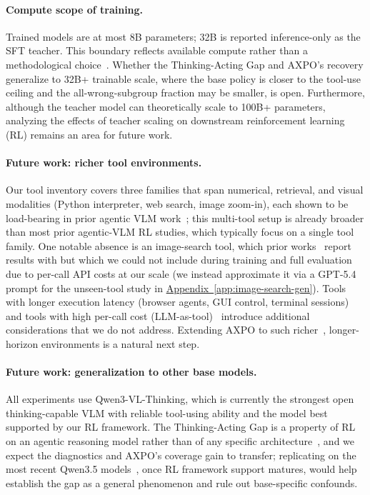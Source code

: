 \documentclass{llmxive}
\providecommand{\appref}[1]{\hyperref[#1]{Appendix~\ref*{#1}}}
\begin{document}
\paragraph{Compute scope of training.}
Trained models are at most 8B parameters; 32B is reported inference-only as the SFT teacher. This boundary reflects available compute rather than a methodological choice~\citep{kim2026visualtokenpruningfails, lee2025maskingteacherreinforcingstudent, yu2026hideseereasoningprefixmasking, lee2026genrecalgenerationrecalibrationlarge, Lee_2025_CVPR}.
Whether the Thinking-Acting Gap and AXPO's recovery generalize to 32B+ trainable scale, where the base policy is closer to the tool-use ceiling and the all-wrong-subgroup fraction may be smaller, is open.
Furthermore, although the teacher model can theoretically scale to 100B+ parameters, analyzing the effects of teacher scaling on downstream reinforcement learning (RL) remains an area for future work.

\paragraph{Future work: richer tool environments.}
Our tool inventory covers three families that span numerical, retrieval, and visual modalities (Python interpreter, web search, image zoom-in), each shown to be load-bearing in prior agentic VLM work~\citep{deepeyesv2, pyvision-rl, mini-o3}; this multi-tool setup is already broader than most prior agentic-VLM RL studies, which typically focus on a single tool family. One notable absence is an image-search tool, which prior works~\citep{deepeyesv2,hrmmsearch} report results with but which we could not include during training and full evaluation due to per-call API costs at our scale (we instead approximate it via a GPT-5.4 prompt for the unseen-tool study in \appref{app:image-search-gen}). Tools with longer execution latency (browser agents, GUI control, terminal sessions) and tools with high per-call cost (LLM-as-tool)~\citep{toolorchestra} introduce additional considerations that we do not address.
Extending AXPO to such richer~\citep{lee2025refinebenchevaluatingrefinementcapability, Lee_2025_ICCV, yu2024sparkmultivisionsensorperception}, longer-horizon environments is a natural next step.

\paragraph{Future work: generalization to other base models.}
All experiments use Qwen3-VL-Thinking, which is currently the strongest open thinking-capable VLM with reliable tool-using ability and the model best supported by our RL framework. The Thinking-Acting Gap is a property of RL on an agentic reasoning model rather than of any specific architecture~\citep{NEURIPS2024_473a9a75, 10.1007/978-3-031-72967-6_16, lee-etal-2024-collavo, lee2024phantomlatentlargelanguage}, and we expect the diagnostics and AXPO's coverage gain to transfer; replicating on the most recent Qwen3.5 models~\citep{qwen35}, once RL framework support matures, would help establish the gap as a general phenomenon and rule out base-specific confounds.
\end{document}
